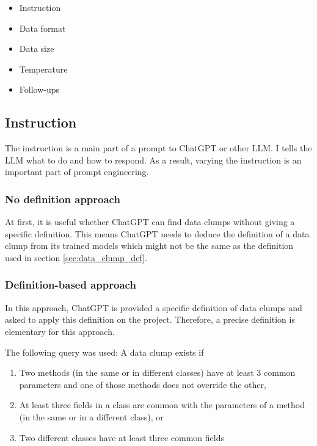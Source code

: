 \begin{itemize}
    \item Instruction
    \item Data format
    \item Data size
    \item Temperature
    \item Follow-ups
\end{itemize}

\subsection{Instruction}\label{sec:llm_instruction}
The instruction is a main part of a prompt to ChatGPT or other \ac{LLM}. I tells the  \ac{LLM} what to do and how to respond. As a result, varying the instruction is an important part of prompt engineering. 

\subsubsection{No definition approach}
At first, it is useful whether ChatGPT can find data clumps without giving a specific definition. This means ChatGPT needs to deduce the definition of a data clump from its trained models which might not be the same as the definition used in section \ref{sec:data_clump_def}.
\begin{comment}
Nevertheless, the results are fairly good. ChatGPT ignores the inheritance between \textit{MathStuff} and \textit{BetterMathStuff} and does not output a data clump for each method in \textit{MathStuff}
\end{comment}
\subsubsection{Definition-based approach}
In this approach, ChatGPT is provided a specific definition of data clumps and asked to apply this definition on the project. Therefore, a precise definition is elementary for this approach.

The following query was used:
A data clump exists if
\begin{enumerate}
\item  Two methods (in the same or in different classes) have at least 3 common parameters
    and one of those methods does not override the other, 
\item At least three fields in a class are common with the parameters of a method (in the same or in a different class), or 
\item Two different classes have at least three common fields
\end{enumerate}

